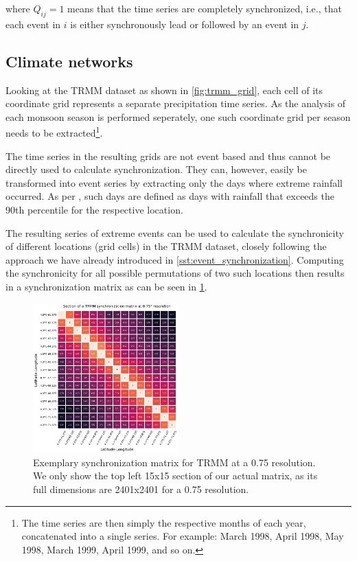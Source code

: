 where $Q_{ij} = 1$ means that the time series are completely synchronized, i.e., that each event in $i$ is either synchronously lead or followed by an event in $j$.

\subsection{Climate networks}
\label{sst:climate_networks}
Looking at the TRMM dataset as shown in \cref{fig:trmm_grid}, each cell of its coordinate grid represents a separate precipitation time series. As the analysis of each monsoon season is performed seperately, one such coordinate grid per season needs to be extracted\footnote{The time series are then simply the respective months of each year, concatenated into a single series. For example: March 1998, April 1998, May 1998, March 1999, April 1999, and so on.}.

The time series in the resulting grids are not event based and thus cannot be directly used to calculate synchronization. They can, however, easily be transformed into event series by extracting only the days where extreme rainfall occurred. As per \citet{Stolbova.2015}, such days are defined as days with rainfall that exceeds the 90th percentile for the respective location.

The resulting series of extreme events can be used to calculate the synchronicity of different locations (grid cells) in the TRMM dataset, closely following the approach we have already introduced in \cref{sst:event_synchronization}. Computing the synchronicity for all possible permutations of two such locations then results in a synchronization matrix as can be seen in \cref{fig:synchronization_matrix}.

\begin{figure}[h]
  \centering
  \includegraphics[width=0.5\textwidth]{./99_appendix/img/trmm_sync_example}
  \caption{Exemplary synchronization matrix for TRMM at a {0.75\degree} resolution. We only show the top left 15x15 section of our actual matrix, as its full dimensions are 2401x2401 for a {0.75\degree} resolution.}
  \label{fig:synchronization_matrix}
\end{figure}

